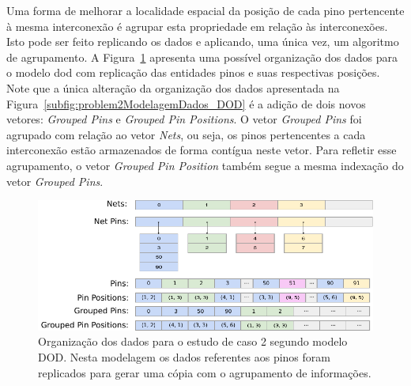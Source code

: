




Uma forma de melhorar a localidade espacial da posição de cada pino pertencente à mesma interconexão é agrupar esta propriedade em relação às interconexões.
Isto pode ser feito replicando os dados e aplicando, uma única vez, um algoritmo de agrupamento. 
A Figura~\ref{fig:problem2Modelagem_DOD_grouped} apresenta uma possível organização dos dados para o modelo \ac{dod} com replicação das entidades pinos e suas respectivas posições. 
Note que a única alteração da organização dos dados apresentada na Figura~\ref{subfig:problem2ModelagemDados_DOD} é a adição de dois novos vetores: \textit{Grouped Pins} e \textit{Grouped Pin Positions}.
O vetor \textit{Grouped Pins} foi agrupado com relação ao vetor \textit{Nets}, ou seja, os pinos pertencentes a cada interconexão estão armazenados de forma contígua neste vetor. Para refletir esse agrupamento, o vetor \textit{Grouped Pin Position} também segue a mesma indexação do vetor \textit{Grouped Pins}.

\begin{figure}[h!]
    \centering
    \includegraphics[width=\linewidth]{img/results/problem2/estimativa_interconection_dod_grouped.pdf}
    \caption[Agrupamento dos dados para o estudo de caso 2]{Organização dos dados para o estudo de caso 2 segundo modelo DOD. Nesta modelagem os dados referentes aos pinos foram replicados para gerar uma cópia com o agrupamento de informações.}
    \label{fig:problem2Modelagem_DOD_grouped}
\end{figure}


